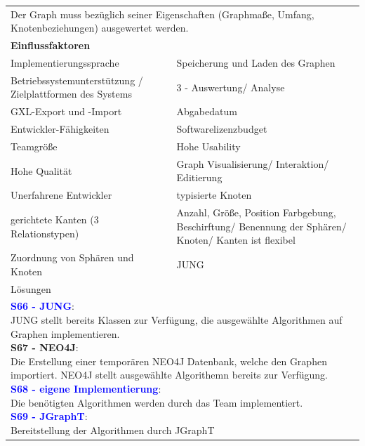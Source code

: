 \documentclass[enabledeprecatedfontcommands,fontsize=11pt,paper=a4,twoside]{scrartcl}
\newcommand{\cb}[1]{{\textcolor{blue}{#1}}}
\begin{document}
\newpage
\hspace{-0.65cm}
\begin{tabular} {|p{8cm} p{8cm}|}
	\hline
	\rowcolor{prob}\multicolumn{2}{|l|}{\parbox{16cm}{\textbf{26: Auswertung von Grapheigenschaften}}} \\  \hline\hline 
	\multicolumn{2}{|l|}{\parbox{16cm}{Der Graph muss bezüglich seiner Eigenschaften (Graphmaße, Umfang, Knotenbeziehungen) ausgewertet werden.}}\rule{0pt}{4ex}\\ [1ex] \hline
	\multicolumn{2}{|l|}{\textbf{Einflussfaktoren}}\\
	Implementierungssprache &  Speicherung und Laden des Graphen \\
	Betriebssystemunterstützung / Zielplattformen des Systems &  3 - Auswertung/ Analyse\\
	GXL-Export und -Import & Abgabedatum\\
	Entwickler-Fähigkeiten & Softwarelizenzbudget\\
	Teamgröße & Hohe Usability\\
	Hohe Qualität & Graph Visualisierung/ Interaktion/ Editierung\\
	Unerfahrene Entwickler & typisierte Knoten\\
	gerichtete Kanten (3 Relationstypen) & Anzahl, Größe, Position Farbgebung, Beschirftung/ Benennung der Sphären/ Knoten/ Kanten ist flexibel\\
	Zuordnung von Sphären und Knoten & JUNG   \\ \hline
	\multicolumn{2}{|l|}{Lösungen} \\
	\multicolumn{2}{|l|}{\parbox{16cm}{
			\textbf{\cb{S66 - JUNG}}: \\
			JUNG stellt bereits Klassen zur Verfügung, die ausgewählte Algorithmen auf Graphen implementieren. \\
			\textbf{S67 - NEO4J}: \\
			Die Erstellung einer temporären NEO4J Datenbank, welche den Graphen importiert. NEO4J stellt ausgewählte Algorithemn bereits zur Verfügung. \\
			\textbf{\cb{S68 - eigene Implementierung}}: \\
			Die benötigten Algorithmen werden durch das Team implementiert.\\
			\textbf{\cb{S69 - JGraphT}}:\\
			Bereitstellung der Algorithmen durch JGraphT
	} }\\ [11ex] \hline
\end{tabular}\\ \\ \\
\end{document}
